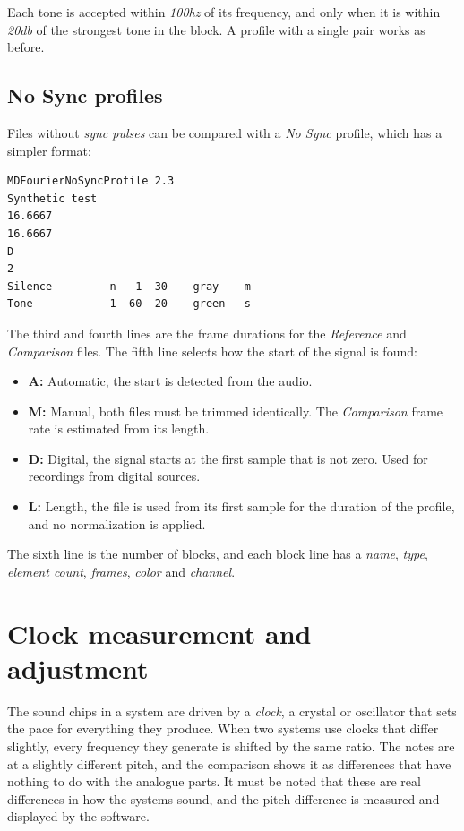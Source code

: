 \documentclass[10pt,a4paper]{report}
\newcommand{\hz}[1]{\textit{\mbox{#1\acrshort{hz}}}}
\newcommand{\dbSPL}[1]{\textit{\mbox{#1\acrshort{db}}}}
\begin{document}
\begin{appendices}
\begin{itemize}
	Each tone is accepted within \hz{100} of its frequency, and only when it is within \dbSPL{20} of the strongest tone in the block. A profile with a single pair works as before.
\end{itemize}



\section{No Sync profiles}
\label{nosyncprofile}

Files without \textit{sync pulses} can be compared with a \textit{No Sync} profile, which has a simpler format:

\begin{verbatim}
MDFourierNoSyncProfile 2.3
Synthetic test
16.6667
16.6667
D
2
Silence         n   1  30    gray    m
Tone            1  60  20    green   s
\end{verbatim}

The third and fourth lines are the frame durations for the \textit{Reference} and \textit{Comparison} files. The fifth line selects how the start of the signal is found:

\begin{itemize}
	\item \textbf{A:} Automatic, the start is detected from the audio.
	\item \textbf{M:} Manual, both files must be trimmed identically. The \textit{Comparison} frame rate is estimated from its length.
	\item \textbf{D:} Digital, the signal starts at the first sample that is not zero. Used for recordings from digital sources.
	\item \textbf{L:} Length, the file is used from its first sample for the duration of the profile, and no normalization is applied.
\end{itemize}

The sixth line is the number of blocks, and each block line has a \textit{name}, \textit{type}, \textit{element count}, \textit{frames}, \textit{color} and \textit{channel}.

\chapter{Clock measurement and adjustment}
\label{clockmeasure}

The sound chips in a system are driven by a \textit{clock}, a crystal or oscillator that sets the pace for everything they produce. When two systems use clocks that differ slightly, every frequency they generate is shifted by the same ratio. The notes are at a slightly different pitch, and the comparison shows it as differences that have nothing to do with the analogue parts. It must be noted that these are real differences in how the systems sound, and the pitch difference is measured and displayed by the software.


\end{appendices}
\end{document}
